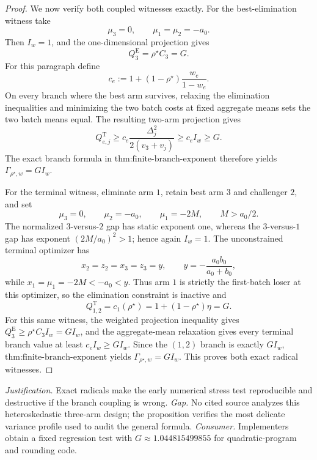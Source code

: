 \documentclass{article}
\begin{document}
\begin{proof}
We now verify both coupled witnesses exactly. For the best-elimination witness take
\[
 \mu_3=0,\qquad \mu_1=\mu_2=-a_0.
\]
Then \(I_w=1\), and the one-dimensional projection gives
\[
 Q_3^{\mathrm E}=\rho^\star C_3=G.
\]
For this paragraph define
\[
 c_e:=1+(1-\rho^\star)\frac{w_e}{1-w_e}.
\]
On every branch where the best arm survives, relaxing the elimination inequalities and minimizing the two batch costs at fixed aggregate means sets the two batch means equal. The resulting two-arm projection gives
\[
 Q_{e,j}^{\mathrm T}
 \geq c_e\frac{\Delta_j^2}{2(v_3+v_j)}
 \geq c_e I_w\geq G.
\]
The exact branch formula in \(\text{thm:finite-branch-exponent}\) therefore yields \(\Gamma_{\rho^\star,w}=G I_w\).

For the terminal witness, eliminate arm \(1\), retain best arm \(3\) and challenger \(2\), and set
\[
 \mu_3=0,\qquad \mu_2=-a_0,\qquad
 \mu_1=-2M,\qquad M>a_0/2.
\]
The normalized \(3\)-versus-\(2\) gap has static exponent one, whereas the \(3\)-versus-\(1\) gap has exponent \((2M/a_0)^2>1\); hence again \(I_w=1\). The unconstrained terminal optimizer has
\[
 x_2=z_2=x_3=z_3=y,\qquad
 y=-\frac{a_0b_0}{a_0+b_0},
\]
while \(x_1=\mu_1=-2M<-a_0<y\). Thus arm \(1\) is strictly the first-batch loser at this optimizer, so the elimination constraint is inactive and
\[
 Q_{1,2}^{\mathrm T}
 =c_1(\rho^\star)
 =1+(1-\rho^\star)\eta
 =G.
\]
For this same witness, the weighted projection inequality gives \(Q_3^{\mathrm E}\geq\rho^\star C_3I_w=G I_w\), and the aggregate-mean relaxation gives every terminal branch value at least \(c_eI_w\geq G I_w\). Since the \((1,2)\) branch is exactly \(G I_w\), \(\text{thm:finite-branch-exponent}\) yields \(\Gamma_{\rho^\star,w}=G I_w\). This proves both exact radical witnesses.
\end{proof}
\par\smallskip\noindent \textit{Justification.} Exact radicals make the early numerical stress test reproducible and destructive if the branch coupling is wrong. \textit{Gap.} No cited source analyzes this heteroskedastic three-arm design; the proposition verifies the most delicate variance profile used to audit the general formula. \textit{Consumer.} Implementers obtain a fixed regression test with \(G\approx1.044815499855\) for quadratic-program and rounding code.
\end{document}
